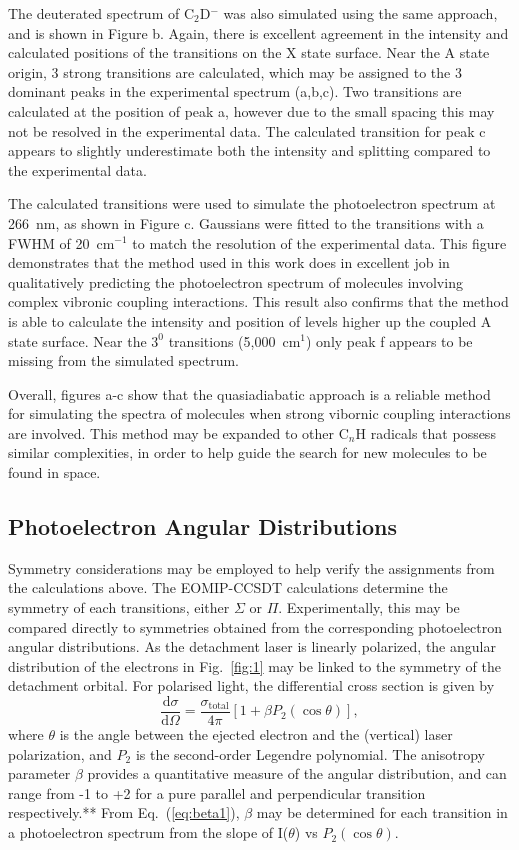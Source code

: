 \documentclass[journal=jpcafh,manuscript=article,layout=onecolumn, 12pt]{achemso}
\begin{document}
The deuterated spectrum of C$_2$D$^-$ was also simulated using the same approach, and is shown in Figure b. Again, there is excellent agreement in the intensity and calculated positions of the transitions on the X state surface. Near the A state origin, 3 strong transitions are calculated, which may be assigned to the 3 dominant peaks in the experimental spectrum (a,b,c). Two transitions are calculated at the position of peak a, however due to the small spacing this may not be resolved in the experimental data. The calculated transition for peak c appears to slightly underestimate both the intensity and splitting compared to the experimental data.

The calculated transitions were used to simulate the photoelectron spectrum at 266~nm, as shown in Figure c. Gaussians were fitted to the transitions with a FWHM of 20~cm$^{-1}$ to match the resolution of the experimental data. This figure demonstrates that the method used in this work does in excellent job in qualitatively predicting the photoelectron spectrum of molecules involving complex vibronic coupling interactions. This result also confirms that the method is able to calculate the intensity and position of levels higher up the coupled A state surface. Near the $3^0$ transitions (5,000~cm$^1$) only peak f appears to be missing from the simulated spectrum.

Overall, figures a-c show that the quasiadiabatic approach is a reliable method for simulating the spectra of molecules when strong vibornic coupling interactions are involved. This method may be expanded to other C$_n$H radicals that possess similar complexities, in order to help guide the search for new molecules to be found in space.

\subsection{Photoelectron Angular Distributions}
Symmetry considerations may be employed to help verify the assignments from the calculations above. The EOMIP-CCSDT calculations determine the symmetry of each transitions, either $\Sigma$ or $\Pi$. Experimentally, this may be compared directly to symmetries obtained from the corresponding photoelectron angular distributions. As the detachment laser is linearly polarized, the angular distribution of the electrons in Fig.~\ref{fig:1} may be linked to the symmetry of the detachment orbital. For polarised light, the differential cross section is given by   
\begin{equation}
	\frac{\text{d}\sigma}{\text{d}\Omega}=\frac{\sigma_{\text{total}}}{4\pi}[1+\beta P_{2}(\cos\theta)],
	\label{eq:beta1}
\end{equation}
where $\theta$ is the angle between the ejected electron and the (vertical) 
laser polarization, and $P_2$ is the second-order Legendre polynomial. The anisotropy parameter $\beta$ provides a quantitative measure of the angular distribution, and can range from -1 to +2 for a pure parallel and perpendicular transition respectively.** From Eq.~(\ref{eq:beta1}), $\beta$ may be determined for each transition in a photoelectron spectrum from the slope of I($\theta$) vs $P_2(\cos\theta)$. 
\end{document}
